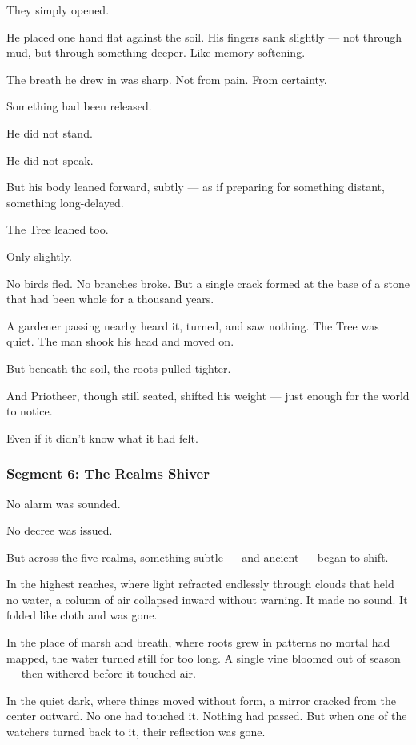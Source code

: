 \documentclass[9pt]{article}
\begin{document}
They simply opened.

He placed one hand flat against the soil. His fingers sank slightly — not through mud, but through something deeper. Like memory softening.

The breath he drew in was sharp. Not from pain. From certainty.

Something had been released.

He did not stand.

He did not speak.

But his body leaned forward, subtly — as if preparing for something distant, something long-delayed.

The Tree leaned too.

Only slightly.

No birds fled. No branches broke. But a single crack formed at the base of a stone that had been whole for a thousand years.

A gardener passing nearby heard it, turned, and saw nothing. The Tree was quiet. The man shook his head and moved on.

But beneath the soil, the roots pulled tighter.

And Priotheer, though still seated, shifted his weight — just enough for the world to notice.

Even if it didn’t know what it had felt.



\newpage

\subsubsection*{Segment 6: The Realms Shiver}

No alarm was sounded.

No decree was issued.

But across the five realms, something subtle — and ancient — began to shift.

In the highest reaches, where light refracted endlessly through clouds that held no water, a column of air collapsed inward without warning. It made no sound. It folded like cloth and was gone.

In the place of marsh and breath, where roots grew in patterns no mortal had mapped, the water turned still for too long. A single vine bloomed out of season — then withered before it touched air.

In the quiet dark, where things moved without form, a mirror cracked from the center outward. No one had touched it. Nothing had passed. But when one of the watchers turned back to it, their reflection was gone.
\end{document}
